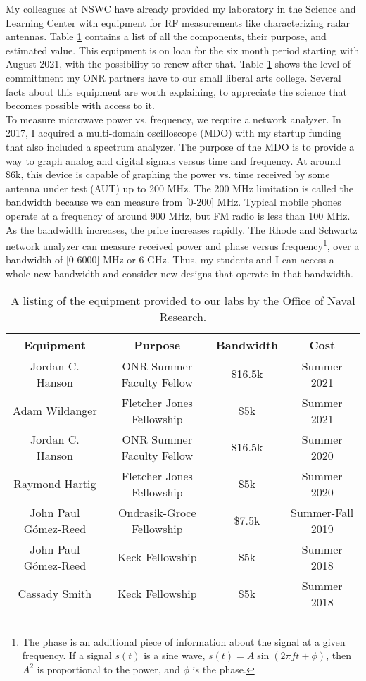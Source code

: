 \documentclass[../../../main.tex]{subfiles}
\begin{document}
My colleagues at NSWC have already provided my laboratory in the Science and Learning Center with equipment for RF measurements like characterizing radar antennas.  Table \ref{tab:equip} contains a list of all the components, their purpose, and estimated value.  This equipment is on loan for the six month period starting with August 2021, with the possibility to renew after that.  Table \ref{tab:equip} shows the level of committment my ONR partners have to our small liberal arts college.  Several facts about this equipment are worth explaining, to appreciate the science that becomes possible with access to it.
\\
\vspace{0.25cm}
To measure microwave power vs. frequency, we require a network analyzer.  In 2017, I acquired a multi-domain oscilloscope (MDO) with my startup funding that also included a spectrum analyzer.  The purpose of the MDO is to provide a way to graph analog and digital signals versus time and frequency.  At around \$6k, this device is capable of graphing the power vs. time received by some antenna under test (AUT) up to 200 MHz.  The 200 MHz limitation is called the bandwidth because we can measure from [0-200] MHz.  Typical mobile phones operate at a frequency of around 900 MHz, but FM radio is less than 100 MHz.  As the bandwidth increases, the price increases rapidly.  The Rhode and Schwartz network analyzer can measure received power and phase versus frequency\footnote{The phase is an additional piece of information about the signal at a given frequency.  If a signal $s(t)$ is a sine wave, $s(t) = A\sin(2\pi f t + \phi)$, then $A^2$ is proportional to the power, and $\phi$ is the phase.}, over a bandwidth of [0-6000] MHz or 6 GHz.  Thus, my students and I can access a whole new bandwidth and consider new designs that operate in that bandwidth.
\\
\vspace{0.25cm}

\begin{table}
\centering
\begin{tabular}{c c c c}
Equipment & Purpose & Bandwidth & Cost \\ \hline
Jordan C. Hanson & ONR Summer Faculty Fellow & \$16.5k & Summer 2021 \\
Adam Wildanger & Fletcher Jones Fellowship & \$5k & Summer 2021 \\
Jordan C. Hanson & ONR Summer Faculty Fellow & \$16.5k & Summer 2020 \\
Raymond Hartig & Fletcher Jones Fellowship & \$5k & Summer 2020 \\
John Paul G\'{o}mez-Reed & Ondrasik-Groce Fellowship & \$7.5k & Summer-Fall 2019 \\
John Paul G\'{o}mez-Reed & Keck Fellowship & \$5k & Summer 2018 \\
Cassady Smith & Keck Fellowship & \$5k & Summer 2018 \\
\end{tabular}
\caption{\label{tab:equip} A listing of the equipment provided to our labs by the Office of Naval Research.}
\end{table}
\end{document}
